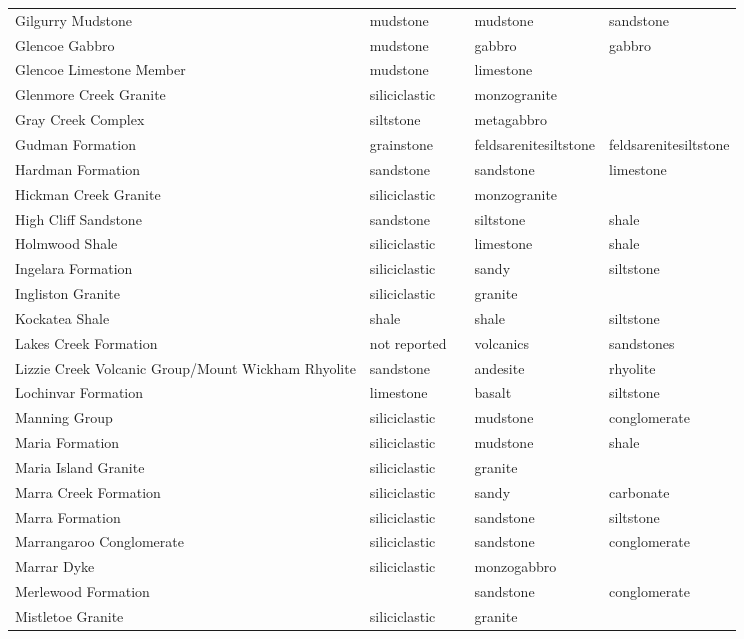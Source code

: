 \begin{tiny}
\begin{longtable}{p{5cm} l l l l}
    Gilgurry Mudstone & mudstone &  & mudstone & sandstone \\ 
    Glencoe Gabbro & mudstone &  & gabbro & gabbro \\ 
    Glencoe Limestone Member & mudstone &  & limestone &  \\ 
    Glenmore Creek Granite & siliciclastic &  & monzogranite &  \\ 
    Gray Creek Complex & siltstone &  & metagabbro &  \\ 
    Gudman Formation & grainstone &  & feldsarenitesiltstone & feldsarenitesiltstone \\ 
    Hardman Formation & sandstone &  & sandstone & limestone \\ 
    Hickman Creek Granite & siliciclastic &  & monzogranite &  \\ 
    High Cliff Sandstone & sandstone &  & siltstone & shale \\ 
    Holmwood Shale & siliciclastic &  & limestone & shale \\ 
    Ingelara Formation & siliciclastic &  & sandy & siltstone \\ 
    Ingliston Granite & siliciclastic &  & granite &  \\ 
    Kockatea Shale & shale &  & shale & siltstone \\ 
    Lakes Creek Formation & not reported &  & volcanics & sandstones \\ 
    Lizzie Creek Volcanic Group/Mount Wickham Rhyolite & sandstone &  & andesite & rhyolite \\ 
    Lochinvar Formation & limestone &  & basalt & siltstone \\ 
    Manning Group & siliciclastic &  & mudstone & conglomerate \\ 
    Maria Formation & siliciclastic &  & mudstone & shale \\ 
    Maria Island Granite & siliciclastic &  & granite &  \\ 
    Marra Creek Formation & siliciclastic &  & sandy & carbonate \\ 
    Marra Formation & siliciclastic &  & sandstone & siltstone \\ 
    Marrangaroo Conglomerate & siliciclastic &  & sandstone & conglomerate \\ 
    Marrar Dyke & siliciclastic &  & monzogabbro &  \\ 
    Merlewood Formation &  &  & sandstone & conglomerate \\ 
    Mistletoe Granite & siliciclastic &  & granite &  \\ 

\end{longtable}
\end{tiny}
